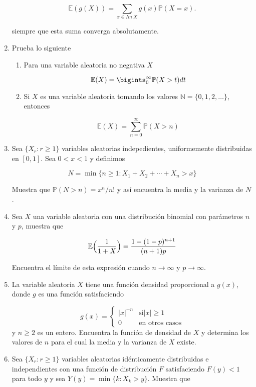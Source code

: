 \documentclass[a4paper,11pt]{report}
\begin{document}
\begin{enumerate}
$$
\mathbb{E}(g(X)) = \sum_{x \in Im\ X}g(x)\mathbb{P}(X =x).
$$

siempre que esta suma converga absolutamente.
\item Prueba lo siguiente

\begin{enumerate}
	\item Para una variable aleatoria no negativa $X$
	
	\[
	\mathbb{E}(X) = \bigints_{0}^{\infty}\mathbb{P}(X >t)dt
	\]
	\item Si $X$ es una variable aleatoria tomando los valores $\mathbb{N} = \{0,1,2, \dots\}$, entonces

\[
\mathbb{E}(X) =\sum_{n = 0}^{\infty}\mathbb{P}(X >n)
\]


\end{enumerate}

\item Sea $\{X_r: r\geq 1 \}$ variables aleatorias indepedientes, uniformemente distribuidas en $[0,1]$. Sea $0 < x < 1$ y definimos

\[
N = \min\{n \geq 1: X_1 +X_2 + \cdots + X_n > x\}
\]

Muestra que $\mathbb{P}(N > n) = x^n/n!$ y as\'i encuentra la media y la varianza de $N$.
\item Sea $X$ una variable aleatoria con una distribuci\'on binomial con par\'ametros $n$ y $p$, muestra que 

\[
\mathbb{E}\Bigl( \dfrac{1}{1 + X}\Bigr) = \dfrac{1 -(1-p)^{n +1}}{(n+1)p}
\] 

Encuentra el l\'imite de esta expresi\'on cuando $n \rightarrow \infty$ y $p \rightarrow \infty$.
\item La variable aleatoria $X$ tiene una funci\'on densidad proporcional a $g(x)$, donde $g$ es una funci\'on satisfaciendo

\[
g(x) = \begin{cases}
\vert x\vert^{-n} & \text{si} \vert x \vert \geq 1 \\
0 & \text{en otros casos}
\end{cases}
\]
y $n \geq 2$ es un entero. Encuentra la funci\'on de densidad de $X$ y determina los valores de $n$ para el cual la media y la varianza de $X$ existe.

\item Sea $\{X_r: r \geq 1\}$ variables aleatorias  id\'enticamente distribuidas e independientes con una funci\'on de distribuci\'on $F$ satisfaciendo $F(y) < 1$ para todo $y$ y sea $Y(y) = \min \{k:X_k > y \}$. Muestra que


\end{enumerate}
\end{document}
